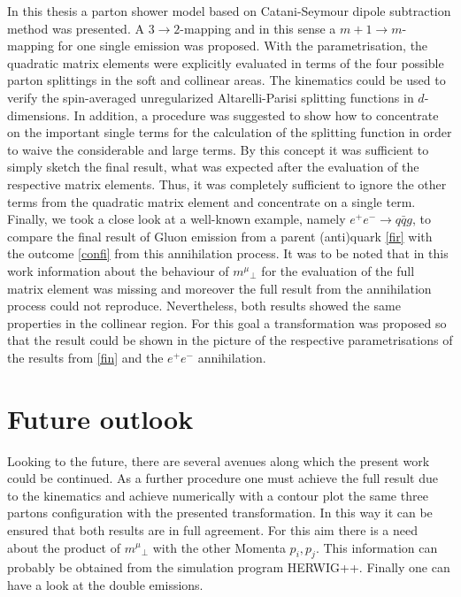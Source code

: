 In this thesis a parton shower model based on Catani-Seymour dipole subtraction method was presented.
A $3\rightarrow 2 $-mapping and in this sense a $m+1\rightarrow m $-mapping for one single emission was proposed. With the parametrisation, the quadratic matrix elements were explicitly evaluated in terms of the four possible parton splittings in the soft and collinear areas. The kinematics could be used to verify the spin-averaged  unregularized  Altarelli-Parisi  splitting  functions  in $ d $-dimensions. In addition, a procedure was suggested to show how to concentrate on the important single terms for the calculation of the splitting function in order to waive the considerable and large terms. By this concept it was sufficient to simply sketch the final result, what was expected after the evaluation of the respective matrix elements. Thus, it was completely sufficient to ignore the other terms from the quadratic matrix element and concentrate on a single term. Finally, we took a close look at a well-known example, namely $ e^{+}e^{-} \rightarrow q \bar{q} g $, to compare the final result of Gluon emission from a parent (anti)quark \ref{fir} with the outcome \ref{confi} from this annihilation process. It was to be noted that in this work information about the behaviour of ${m^{\mu}}_{\bot}$ for the evaluation of the full matrix element was missing and moreover the full result from the annihilation process could not reproduce. Nevertheless, both results showed the same properties in the collinear region. For this goal a transformation was proposed so that the result could be shown in the picture of the respective parametrisations of the results from \ref{fin} and the $ e^{+}e^{-}$ annihilation. 

\section*{Future outlook}
Looking to the future, there are several avenues along which the present work could be continued. As a further procedure one must achieve the full result due to the kinematics and achieve numerically with a contour plot the same three partons configuration with the presented transformation. In this way it can be ensured that both results are in full agreement. For this aim there is a need about the product of ${m^{\mu}}_{\bot}$ with the other Momenta $ p_i, p_j $. This information can probably be obtained from the simulation program HERWIG++. Finally one can have a look at the double emissions.